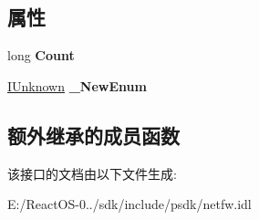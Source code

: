 \subsection*{属性}
\begin{DoxyCompactItemize}
\item 
\mbox{\label{interface_i_net_fw_authorized_applications_ac5a83ac1824eb76455c21789b0739cbd}} 
long {\bfseries Count}
\item 
\mbox{\label{interface_i_net_fw_authorized_applications_a2cd1b4ef0d8f9fc385947ac62db0cf1a}} 
\hyperlink{interface_i_unknown}{I\+Unknown} {\bfseries \+\_\+\+New\+Enum}
\end{DoxyCompactItemize}
\subsection*{额外继承的成员函数}


该接口的文档由以下文件生成\+:\begin{DoxyCompactItemize}
\item 
E\+:/\+React\+O\+S-\/0../sdk/include/psdk/netfw.\+idl\end{DoxyCompactItemize}
